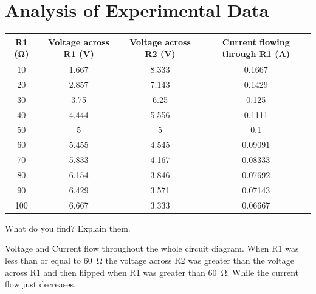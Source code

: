 \documentclass[a4paper]{article}
\newcommand\tab[1][0.5cm]{\hspace*{#1}}
\begin{document}
\section*{Analysis of Experimental Data}
\begin{tabular}{|c|c|c|c|}
	\hline
	R1 (\si{\ohm}) & Voltage across R1 (\si{\volt}) & Voltage across R2 (\si{\volt}) & Current flowing through R1 (\si{\ampere}) \\
	\hline
	10             & 1.667                          & 8.333                          & 0.1667                                    \\
	\hline
	20             & 2.857                          & 7.143                          & 0.1429                                    \\
	\hline
	30             & 3.75                           & 6.25                           & 0.125                                     \\
	\hline
	40             & 4.444                          & 5.556                          & 0.1111                                    \\
	\hline
	50             & 5                              & 5                              & 0.1                                       \\
	\hline
	60             & 5.455                          & 4.545                          & 0.09091                                   \\
	\hline
	70             & 5.833                          & 4.167                          & 0.08333                                   \\
	\hline
	80             & 6.154                          & 3.846                          & 0.07692                                   \\
	\hline
	90             & 6.429                          & 3.571                          & 0.07143                                   \\
	\hline
	100            & 6.667                          & 3.333                          & 0.06667                                   \\
	\hline
\end{tabular}

\tab What do you find? Explain them.

\tab\tab Voltage and Current flow throughout the whole circuit diagram. When R1 was less than or equal to \SI{60}{\ohm} the voltage across R2 was greater than the voltage across R1 and then flipped when R1 was greater than \SI{60}{\ohm}. While the current flow just decreases.
\end{document}

